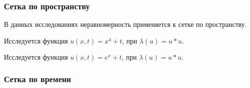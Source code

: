\newcommand{\graphgridtime}[1]{
\noindent\begin{tikzpicture}
\begin{semilogyaxis}[xlabel=t,ylabel=Точность решения,width=\textwidth, height=6cm]
\addplot[red, no markers] table [skip first n=1, y=r1, x=t]{#1.txt};
\addplot[blue, no markers] table [skip first n=1, y=r2, x=t]{#1.txt};
\addplot[green, no markers] table [skip first n=1, y=r3, x=t]{#1.txt};
\addplot[orange, no markers] table [skip first n=1, y=r4, x=t]{#1.txt};
\addplot[black, no markers] table [skip first n=1, y=ru, x=t]{#1.txt};
\legend{$m_{1, t}$,$m_{2, t}$,$m_{3, t}$,$m_{4, t}$,$x$}
\end{semilogyaxis}
\end{tikzpicture}

\noindent\begin{tikzpicture}
\begin{semilogyaxis}[xlabel=t,ylabel=Число итераций,width=\textwidth, height=6cm]
\addplot[red, no markers] table [skip first n=1, y=i1, x=t]{#1.txt};
\addplot[blue, no markers] table [skip first n=1, y=i2, x=t]{#1.txt};
\addplot[green, no markers] table [skip first n=1, y=i3, x=t]{#1.txt};
\addplot[orange, no markers] table [skip first n=1, y=i4, x=t]{#1.txt};
\addplot[black, no markers] table [skip first n=1, y=iu, x=t]{#1.txt};
\legend{$m_{1, t}$,$m_{2, t}$,$m_{3, t}$,$m_{4, t}$,$x$}
\end{semilogyaxis}
\end{tikzpicture}
}

\subsubsection{Сетка по пространству}

В данных исследованиях неравномерность применяется к сетке по пространству.


Исследуется функция $u(x, t) = x^4 + t$, при $\lambda(u) = u*u$.



Исследуется функция $u(x, t) = e^x + t$, при $\lambda(u) = u*u$.


\subsubsection{Сетка по времени}

